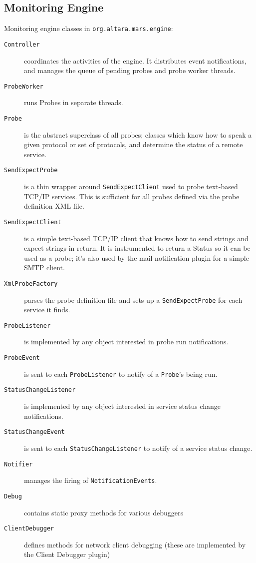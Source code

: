 \documentclass{article}
\newcommand{\identifier}[1]{{\tt #1}}
\newcommand{\openclasstable}{\begin{description}}
\newcommand{\closeclasstable}{\end{description}}
\newcommand{\classdesc}[2]{ \item[\identifier{#1}]{#2} }
\begin{document}
\subsection{Monitoring Engine}
Monitoring engine classes in \identifier{org.altara.mars.engine}:
\openclasstable
\classdesc{Controller}{coordinates the activities of the engine. It distributes
event notifications, and manages the queue of pending probes and probe worker
threads.}
\classdesc{ProbeWorker}{runs Probes in separate threads.}
\classdesc{Probe}{is the abstract superclass of all probes; classes which know
how to speak a given protocol or set of protocols, and determine the status of
a remote service.}
\classdesc{SendExpectProbe}{is a thin wrapper around
\identifier{SendExpectClient} used to probe text-based TCP/IP services. This is
sufficient for all probes defined via the probe definition XML file.}
\classdesc{SendExpectClient}{is a simple text-based TCP/IP client that knows
how to send strings and expect strings in return. It is instrumented to return
a Status so it can be used as a probe; it's also used by the mail notification
plugin for a simple SMTP client.}
\classdesc{XmlProbeFactory}{parses the probe definition file and sets up a
\identifier{SendExpectProbe} for each service it finds.}
\classdesc{ProbeListener}{is implemented by any object interested in probe run
notifications.}
\classdesc{ProbeEvent}{is sent to each \identifier{ProbeListener} to notify of
a \identifier{Probe}'s being run.}
\classdesc{StatusChangeListener}{is implemented by any object interested in
service status change notifications.}
\classdesc{StatusChangeEvent}{is sent to each \identifier{StatusChangeListener}
to notify of a service status change.}
\classdesc{Notifier}{manages the firing of \identifier{NotificationEvents}.}
\classdesc{Debug}{contains static proxy methods for various debuggers}
\classdesc{ClientDebugger}{defines methods for network client debugging (these are implemented by the Client Debugger plugin)}
\closeclasstable
\end{document}
